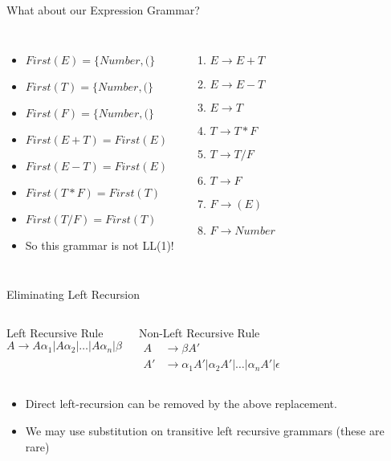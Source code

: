 \documentclass[handout]{beamer}
\begin{document}
\begin{frame}{What about our Expression Grammar?}
\begin{columns}
    \begin{itemize}[<+->]
        \item $First(E) = \{Number, (\}$
        \item $First(T) = \{Number, (\}$
        \item $First(F) = \{Number,(\}$
        \item $First(E+T) = First(E)$
        \item $First(E-T) = First(E)$
        \item $First(T*F) = First(T)$
        \item $First(T/F) = First(T)$
        \item So this grammar is not LL(1)!
    \end{itemize}
    
    \begin{enumerate}
        \item $E \rightarrow E+T$
        \item $E \rightarrow E-T$
        \item $E \rightarrow T$
        \item $T \rightarrow T*F$
        \item $T \rightarrow T/F$
        \item $T \rightarrow F$
        \item $F \rightarrow (E)$
        \item $F \rightarrow Number$
    \end{enumerate}    
\end{columns}
\end{frame}

\begin{frame}{Eliminating Left Recursion}
\begin{columns}
    \begin{block}{Left Recursive Rule}
        \[
        A \rightarrow A\alpha_1 | A\alpha_2 | \ldots | A\alpha_n | \beta
        \]
    \end{block}
    \begin{block}{Non-Left Recursive Rule}
        \begin{align*}
            A &\rightarrow \beta A'\\
            A' & \rightarrow \alpha_1 A' | \alpha_2 A' | \ldots | \alpha_n A'| \epsilon
        \end{align*}
    \end{block}
\end{columns}
\begin{itemize}
    \item Direct left-recursion can be removed by the above replacement.
    \item We may use substitution on transitive left recursive grammars (these are rare)
\end{itemize}
\end{frame}
\end{document}
